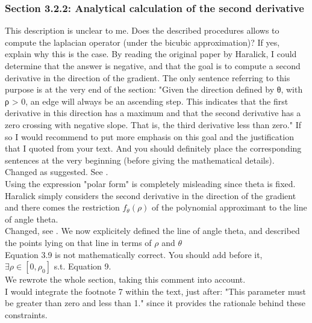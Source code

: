 \documentclass[a4paper,10pt]{report}
\begin{document}
\subsubsection{Section 3.2.2: Analytical calculation of the second derivative}

\que This description is unclear to me. Does the described procedures allows to
compute the laplacian operator (under the bicubic approximation)? If yes,
explain why this is the case. By reading the original paper by Haralick, I
could determine that the answer is negative, and that the goal is to compute a second derivative in the direction of the gradient. The only sentence referring to this purpose is at the very end of the section:
"Given the direction defined by θ, with ρ > 0, an edge will always be an
ascending step. This indicates that the first derivative in this direction has
a maximum and that the second derivative has a zero crossing with negative
slope. That is, the third derivative less than zero."
If so I would recommend to put more emphasis on this goal and the justification that I quoted from your text. And you should definitely place the
corresponding sentences at the very beginning (before giving the mathematical details).\\

\ans Changed as suggested. See .\\

\que Using the expression "polar form" is completely misleading since theta is
fixed. Haralick simply considers the second derivative in the direction of the
gradient and there comes the restriction $f_\theta(\rho)$ of the polynomial
approximant to the line of angle theta.\\

\ans Changed, see . We now explicitely defined the line of angle theta, and described the points lying on that line in terms of $\rho$ and $\theta$\\

\que Equation 3.9 is not mathematically correct. You should add before it, $\exists
\rho\in[0,\rho_0]$ s.t. Equation 9.\\

\ans We rewrote the whole section, taking this comment into account.\\

\que I would integrate the footnote 7 within the text, just after: "This parameter
must be greater than zero and less
than 1." since it provides the rationale behind these constraints.\\
\end{document}
